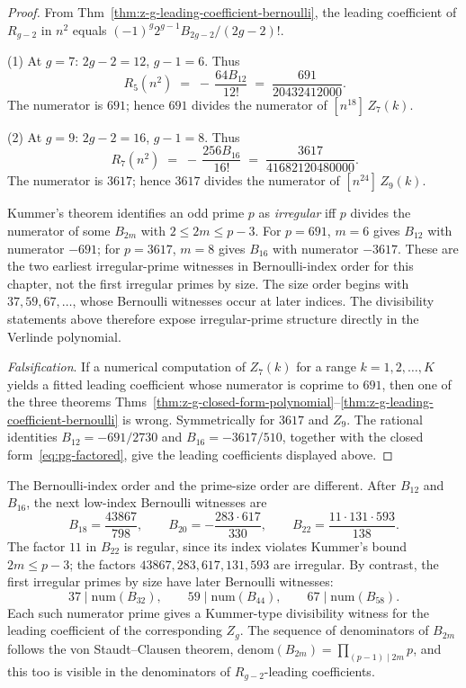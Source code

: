 \begin{proof}
From Thm~\ref{thm:z-g-leading-coefficient-bernoulli}, the leading coefficient
of $R_{g-2}$ in $n^2$ equals
$(-1)^g2^{g-1}B_{2g-2}/(2g-2)!$.

(1) At $g = 7$: $2g-2 = 12$, $g-1 = 6$. Thus
\begin{equation}
[n^{10}]\,R_5(n^2)
\;=\;
-\,\frac{64B_{12}}{12!}
\;=\;
\frac{691}{20432412000}.
\end{equation}
The numerator is $691$; hence $691$ divides the numerator of
$[n^{18}]\,Z_7(k)$.

(2) At $g = 9$: $2g-2 = 16$, $g-1 = 8$. Thus
\begin{equation}
[n^{14}]\,R_7(n^2)
\;=\;
-\,\frac{256B_{16}}{16!}
\;=\;
\frac{3617}{41682120480000}.
\end{equation}
The numerator is $3617$; hence $3617$ divides the numerator of
$[n^{24}]\,Z_9(k)$.

Kummer's theorem identifies an odd prime $p$ as \emph{irregular} iff $p$
divides the numerator of some $B_{2m}$ with $2 \le 2m \le p-3$. For $p=691$,
$m=6$ gives $B_{12}$ with numerator $-691$; for $p=3617$, $m=8$ gives
$B_{16}$ with numerator $-3617$. These are the two earliest
irregular-prime witnesses in Bernoulli-index order for this chapter, not
the first irregular primes by size. The size order begins with
$37,59,67,\ldots$, whose Bernoulli witnesses occur at later indices. The
divisibility statements above therefore expose irregular-prime structure
directly in the Verlinde polynomial.

\emph{Falsification}. If a numerical computation of $Z_7(k)$ for a range
$k = 1, 2, \ldots, K$ yields a fitted leading coefficient whose numerator is
coprime to $691$, then one of the three theorems
Thms~\ref{thm:z-g-closed-form-polynomial}--\ref{thm:z-g-leading-coefficient-bernoulli}
is wrong. Symmetrically for $3617$ and $Z_9$. The rational identities
$B_{12}=-691/2730$ and $B_{16}=-3617/510$, together with the closed
form~\eqref{eq:pg-factored}, give the leading coefficients displayed
above.
\end{proof}

\begin{remark}
\label{rem:next-witnesses}
The Bernoulli-index order and the prime-size order are different. After
$B_{12}$ and $B_{16}$, the next low-index Bernoulli witnesses are
\[
 B_{18}=\frac{43867}{798},\qquad
 B_{20}=-\frac{283\cdot 617}{330},\qquad
 B_{22}=\frac{11\cdot 131\cdot 593}{138}.
\]
The factor $11$ in $B_{22}$ is regular, since its index violates
Kummer's bound $2m\leq p-3$; the factors $43867,283,617,131,593$ are
irregular. By contrast, the first irregular primes by size have later
Bernoulli witnesses:
\[
 37\mid \mathrm{num}(B_{32}),\qquad
 59\mid \mathrm{num}(B_{44}),\qquad
 67\mid \mathrm{num}(B_{58}).
\]
Each such numerator prime gives a Kummer-type divisibility witness for
the leading coefficient of the corresponding $Z_g$. The sequence of
denominators of $B_{2m}$ follows the von Staudt--Clausen theorem,
$\mathrm{denom}(B_{2m}) = \prod_{(p-1) \mid 2m} p$, and this too is visible
in the denominators of $R_{g-2}$-leading coefficients.
\end{remark}

